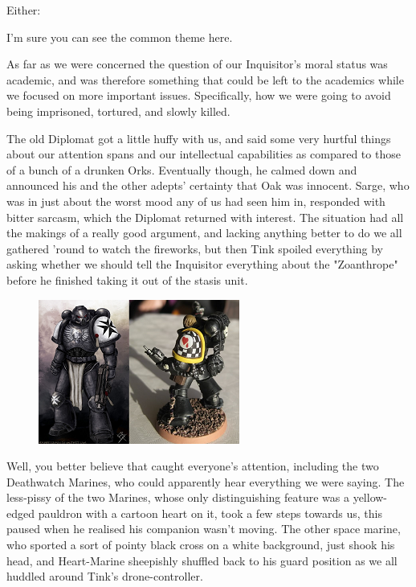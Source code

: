 Either:




I'm sure you can see the common theme here.

As far as we were concerned the question of our Inquisitor's moral status was academic, and was therefore something that could be left to the academics while we focused on more important issues. 
Specifically, how we were going to avoid being imprisoned, tortured, and slowly killed.

The old Diplomat got a little huffy with us, and said some very hurtful things about our attention spans and our intellectual capabilities as compared to those of a bunch of a drunken Orks. 
Eventually though, he calmed down and announced his and the other adepts' certainty that Oak was innocent. 
Sarge, who was in just about the worst mood any of us had seen him in, responded with bitter sarcasm, which the Diplomat returned with interest. 
The situation had all the makings of a really good argument, and lacking anything better to do we all gathered 'round to watch the fireworks, but then Tink spoiled everything by asking whether we should tell the Inquisitor everything about the "Zoanthrope" before he finished taking it out of the stasis unit.

\begin{figure}
	\begin{center}
		\includegraphics[width=\figwidth]{pics/16/7.png}
	\end{center}
\end{figure}
Well, you better believe that caught everyone's attention, including the two Deathwatch Marines, who could apparently hear everything we were saying. 
The less-pissy of the two Marines, whose only distinguishing feature was a yellow-edged pauldron with a cartoon heart on it, took a few steps towards us, this paused when he realised his companion wasn't moving. 
The other space marine, who sported a sort of pointy black cross on a white background, just shook his head, and Heart-Marine sheepishly shuffled back to his guard position as we all huddled around Tink's drone-controller.

